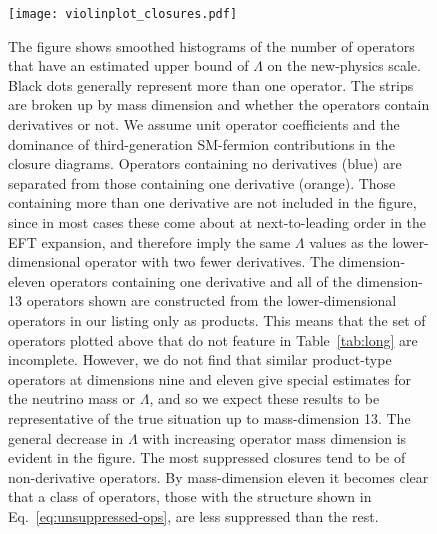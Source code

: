 \begin{figure}
  \centering
  \texttt{[image: violinplot\_closures.pdf]}
  \caption[The figure shows smoothed histograms of the number of operators that
  have an estimated upper bound of $\Lambda$ on the new-physics scale.]{The
    figure shows smoothed histograms of the number of operators that have an
    estimated upper bound of $\Lambda$ on the new-physics scale. Black dots
    generally represent more than one operator. The strips are broken up by mass
    dimension and whether the operators contain derivatives or not. We assume
    unit operator coefficients and the dominance of third-generation SM-fermion
    contributions in the closure diagrams. Operators containing no derivatives
    (blue) are separated from those containing one derivative (orange). Those
    containing more than one derivative are not included in the figure, since in
    most cases these come about at next-to-leading order in the EFT expansion,
    and therefore imply the same $\Lambda$ values as the lower-dimensional
    operator with two fewer derivatives. The dimension-eleven operators
    containing one derivative and all of the dimension-13 operators shown are
    constructed from the lower-dimensional operators in our listing only as
    products. This means that the set of operators plotted above that do not
    feature in Table~\ref{tab:long} are incomplete. However, we do not find that
    similar product-type operators at dimensions nine and eleven give special
    estimates for the neutrino mass or $\Lambda$, and so we expect these results
    to be representative of the true situation up to mass-dimension 13. The
    general decrease in $\Lambda$ with increasing operator mass dimension is
    evident in the figure. The most suppressed closures tend to be of
    non-derivative operators. By mass-dimension eleven it becomes clear that a
    class of operators, those with the structure shown in
    Eq.~\eqref{eq:unsuppressed-ops}, are less suppressed than the rest.}
  \label{fig:violinplot-closures}
\end{figure}

